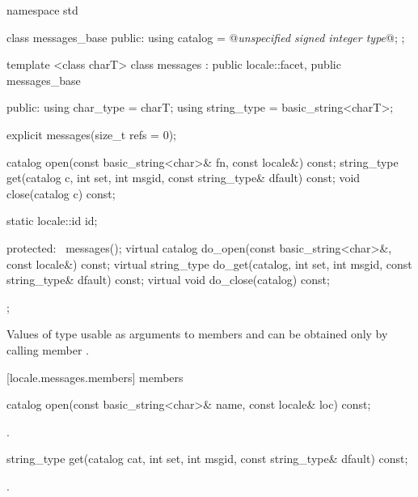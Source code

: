 %
\begin{codeblock}
namespace std {
  class messages_base {
  public:
    using catalog = @\textit{unspecified signed integer type}@;
  };

  template <class charT>
  class messages : public locale::facet, public messages_base {
  public:
    using char_type   = charT;
    using string_type = basic_string<charT>;

    explicit messages(size_t refs = 0);

    catalog open(const basic_string<char>& fn, const locale&) const;
    string_type get(catalog c, int set, int msgid,
                     const string_type& dfault) const;
    void close(catalog c) const;

    static locale::id id;

  protected:
    ~messages();
    virtual catalog do_open(const basic_string<char>&, const locale&) const;
    virtual string_type do_get(catalog, int set, int msgid,
                               const string_type& dfault) const;
    virtual void do_close(catalog) const;
  };
}
\end{codeblock}

\pnum
Values of type
usable as arguments to members
and
can be obtained only by calling member
.

[locale.messages.members]{ members}

%
%
\begin{itemdecl}
catalog open(const basic_string<char>& name, const locale& loc) const;
\end{itemdecl}

\begin{itemdescr}
\pnum
\returns
{}.
\end{itemdescr}

%
%
\begin{itemdecl}
string_type get(catalog cat, int set, int msgid,
                const string_type& dfault) const;
\end{itemdecl}

\begin{itemdescr}
\pnum
\returns
{}.
\end{itemdescr}

